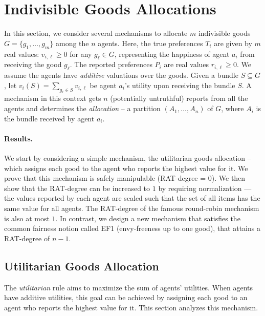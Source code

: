 
\section{Indivisible Goods Allocations}\label{sec:indivisible-good-aloc}
In this section, we consider several mechanisms to allocate $m$ indivisible goods $G = \{g_1, \ldots, g_m\}$ among the $n$ agents.
Here, the true preferences $T_i$ are given by $m$ real values: $v_{i,\ell}  \geq 0$ for any $g_{\ell} \in G$, representing the happiness of agent $a_i$ from receiving the good $g_{\ell}$. 
The reported preferences $P_i$ are real values $r_{i,\ell} \geq 0 $.
We assume the agents have \emph{additive} valuations over the goods.
Given a bundle $S\subseteq G$, let $v_i(S)=\sum_{g_\ell\in S}v_{i,\ell}$ be agent $a_i$'s utility upon receiving the bundle $S$.
A mechanism in this context gets $n$ (potentially untruthful) reports from all the agents and determines the \emph{allocation} -- a partition $(A_1,\ldots,A_n)$ of $G$, where $A_i$ is the bundle received by agent $a_i$.



\paragraph{Results.} We start by considering a simple mechanism, the utilitarian goods allocation -- which assigns each good to the agent who reports the highest value for it.
We prove that this mechanism is safely manipulable (RAT-degree = $0$). 
We then show that the RAT-degree can be increased to $1$ by requiring normalization --- the values reported by each agent are scaled such that the set of all items has the same value for all agents.
The RAT-degree of the famous round-robin mechanism is also at most $1$.
In contrast, we design a new mechanism that satisfies the common fairness notion called EF1 (envy-freeness up to one good), that attains a RAT-degree of $n-1$.



\subsection{Utilitarian Goods Allocation}\label{sec:utilitarian-alloc}
The \emph{utilitarian} rule aims to maximize the sum of agents' utilities. 
When agents have additive utilities, this goal can be achieved by assigning each good to an agent who reports the highest value for it.
This section analyzes this mechanism.

